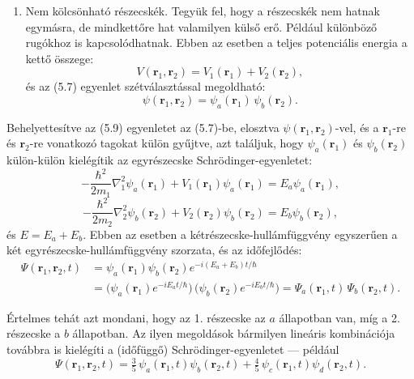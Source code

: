 \documentclass[../main.tex]{subfiles}
\begin{document}
\begin{enumerate}
\item Nem kölcsönható részecskék. Tegyük fel, hogy a részecskék nem hatnak egymásra, de mindkettőre hat valamilyen külső erő. Például különböző rugókhoz is kapcsolódhatnak. Ebben az esetben a teljes potenciális energia a kettő összege:
\begin{equation}
V(\mathbf{r}_1,\mathbf{r}_2) = V_1(\mathbf{r}_1) + V_2(\mathbf{r}_2),
\tag{5.8}
\end{equation}
és az (5.7) egyenlet szétválasztással megoldható:
\begin{equation}
\psi(\mathbf{r}_1,\mathbf{r}_2) = \psi_a(\mathbf{r}_1)\,\psi_b(\mathbf{r}_2).
\tag{5.9}
\end{equation}
\end{enumerate}
Behelyettesítve az (5.9) egyenletet az (5.7)-be, elosztva $\psi(\mathbf{r}_1,\mathbf{r}_2)$-vel, és a $\mathbf{r}_1$-re és $\mathbf{r}_2$-re vonatkozó tagokat külön gyűjtve, azt találjuk, hogy $\psi_a(\mathbf{r}_1)$ és $\psi_b(\mathbf{r}_2)$ külön-külön kielégítik az egyrészecske Schrödinger-egyenletet:
\begin{equation}
-\frac{\hbar^2}{2m_1}\nabla_1^2\psi_a(\mathbf{r}_1) + V_1(\mathbf{r}_1)\psi_a(\mathbf{r}_1) = E_a\psi_a(\mathbf{r}_1),
\tag{5.10a}
\end{equation}
\begin{equation}
-\frac{\hbar^2}{2m_2}\nabla_2^2\psi_b(\mathbf{r}_2) + V_2(\mathbf{r}_2)\psi_b(\mathbf{r}_2) = E_b\psi_b(\mathbf{r}_2),
\tag{5.10b}
\end{equation}
és $E = E_a + E_b$. Ebben az esetben a kétrészecske-hullámfüggvény egyszerűen a két egyrészecske-hullámfüggvény szorzata, és az időfejlődés:
\begin{align}
\Psi(\mathbf{r}_1,\mathbf{r}_2,t)
&= \psi_a(\mathbf{r}_1)\psi_b(\mathbf{r}_2)e^{-i(E_a+E_b)t/\hbar} \nonumber\\
&= \big(\psi_a(\mathbf{r}_1)e^{-iE_a t/\hbar}\big)\,\big(\psi_b(\mathbf{r}_2)e^{-iE_b t/\hbar}\big)
= \Psi_a(\mathbf{r}_1,t)\,\Psi_b(\mathbf{r}_2,t).
\tag{5.11}
\end{align}

Értelmes tehát azt mondani, hogy az 1. részecske az $a$ állapotban van, míg a 2. részecske a $b$ állapotban. Az ilyen megoldások bármilyen lineáris kombinációja továbbra is kielégíti a (időfüggő) Schrödinger-egyenletet — például
\begin{equation}
\Psi(\mathbf{r}_1,\mathbf{r}_2,t) = \tfrac{3}{5}\,\psi_a(\mathbf{r}_1,t)\psi_b(\mathbf{r}_2,t) +
\tfrac{4}{5}\,\psi_c(\mathbf{r}_1,t)\psi_d(\mathbf{r}_2,t).
\tag{5.12}
\end{equation}
\end{document}

